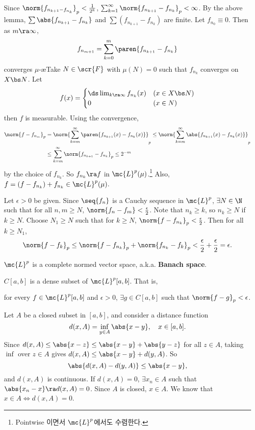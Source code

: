 Since \(\norm{f_{n_{k+1} - f_{n_k}}}_p < \frac{1}{2^k}\), \(\sum_{k=1}^{\infty} \norm{f_{n_{k+1}} - f_{n_k}}_p < \infty\). By the above lemma, \(\sum \abs{f_{n_{k+1}} - f_{n_k}}\) and \(\sum (f_{n_{k+1}} - f_{n_k})\) are finite. Let \(f_{n_0} \equiv 0\). Then as \(m \ra \infty\),
\[
    f_{n_{m+1}} = \sum_{k=0}^{m} \paren{f_{n_{k+1}} - f_{n_k}}
\]
converges \(\mu\)-\ae Take \(N \in \scr{F}\) with \(\mu(N) = 0\) such that \(f_{n_k}\) converges on \(X \bs N\). Let
\[
    f(x) = \begin{cases}
        \ds \lim_{k \ra \infty} f_{n_k} (x) & (x \in X \bs N) \\ 0 & (x\in N)
    \end{cases}
\]
then \(f\) is measurable. Using the convergence,
\[
    \begin{aligned}
        \norm{f - f_{n_m}}_p & = \norm{\sum_{k=m}^{\infty} \paren{f_{n_{k+1}} (x) - f_{n_k}(x)}}_p \leq \norm{\sum_{k=m}^{\infty} \abs{f_{n_{k+1}} (x) - f_{n_k}(x)}}_p \\
                             & \leq \sum_{k=m}^{\infty} \norm{f_{n_{k+1}} - f_{n_k}}_p \leq 2^{-m}
    \end{aligned}
\]
by the choice of \(f_{n_k}\). So \(f_{n_k} \ra f\) in \(\mc{L}^{p}(\mu)\).\footnote{Pointwise 이면서 \(\mc{L}^{p}\)에서도 수렴한다.} Also, \(f = (f - f_{n_k}) + f_{n_k} \in \mc{L}^{p}(\mu)\).

Let \(\epsilon > 0\) be given. Since \(\seq{f_n}\) is a Cauchy sequence in \(\mc{L}^{p}\), \(\exists N \in \N\) such that for all \(n, m \geq N\), \(\norm{f_n - f_m} < \frac{\epsilon}{2}\). Note that \(n_k \geq k\), so \(n_k \geq N\) if \(k \geq N\). Choose \(N_1 \geq N\) such that for \(k \geq N\), \(\norm{f - f_{n_k}}_p < \frac{\epsilon}{2}\). Then for all \(k \geq N_1\),
\[
    \norm{f - f_k}_p \leq \norm{f - f_{n_k}}_p + \norm{f_{n_k} - f_k}_p < \frac{\epsilon}{2} + \frac{\epsilon}{2} = \epsilon.
\]

\rmk \(\mc{L}^{p}\) is a complete normed vector space, a.k.a. \textbf{Banach space}.

 \(C[a, b]\) is a dense subset of \(\mc{L}^{p}[a, b]\). That is,
\begin{center}
    for every \(f \in \mc{L}^{p}[a, b]\) and \(\epsilon > 0\), \(\exists g \in C[a, b]\) such that \(\norm{f - g}_p < \epsilon\).
\end{center}

\pf Let \(A\) be a closed subset in \([a, b]\), and consider a distance function
\[
    d(x, A) = \inf_{y\in A} \abs{x - y}, \quad x \in [a, b].
\]
Since \(d(x, A) \leq \abs{x - z} \leq \abs{x - y} + \abs{y - z}\) for all \(z \in A\), taking \(\inf\) over \(z \in A\) gives \(d(x, A) \leq \abs{x - y} + d(y, A)\). So
\[
    \abs{d(x, A) - d(y, A)} \leq \abs{x - y},
\]
and \(d(x, A)\) is continuous. If \(d(x, A) = 0\), \(\exists x_n \in A\) such that \(\abs{x_n - x} \ra d(x, A) = 0\). Since \(A\) is closed, \(x \in A\). We know that \(x \in A \iff d(x, A) = 0\).

